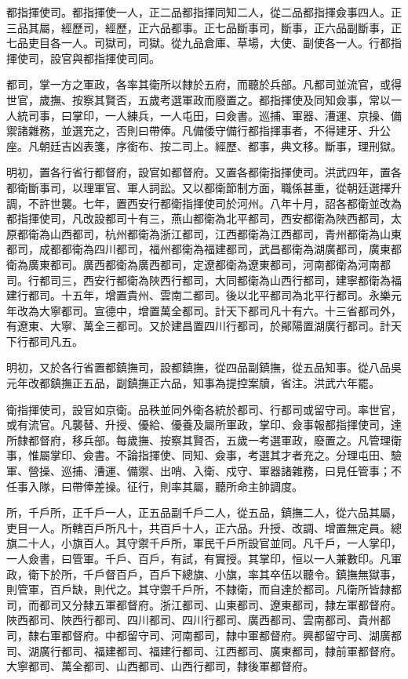 都指揮使司。都指揮使一人，正二品都指揮同知二人，從二品都指揮僉事四人。正三品其屬，經歷司，經歷，正六品都事。正七品斷事司，斷事，正六品副斷事，正七品吏目各一人。司獄司，司獄。從九品倉庫、草場，大使、副使各一人。行都指揮使司，設官與都指揮使司同。

都司，掌一方之軍政，各率其衛所以隸於五府，而聽於兵部。凡都司並流官，或得世官，歲撫、按察其賢否，五歲考選軍政而廢置之。都指揮使及同知僉事，常以一人統司事，曰掌印，一人練兵，一人屯田，曰僉書。巡捕、軍器、漕運、京操、備禦諸雜務，並選充之，否則曰帶俸。凡備倭守備行都指揮事者，不得建牙、升公座。凡朝廷吉凶表箋，序銜布、按二司上。經歷、都事，典文移。斷事，理刑獄。

明初，置各行省行都督府，設官如都督府。又置各都衛指揮使司。洪武四年，置各都衛斷事司，以理軍官、軍人詞訟。又以都衛節制方面，職係甚重，從朝廷選擇升調，不許世襲。七年，置西安行都衛指揮使司於河州。八年十月，詔各都衛並改為都指揮使司，凡改設都司十有三，燕山都衛為北平都司，西安都衛為陜西都司，太原都衛為山西都司，杭州都衛為浙江都司，江西都衛為江西都司，青州都衛為山東都司，成都都衛為四川都司，福州都衛為福建都司，武昌都衛為湖廣都司，廣東都衛為廣東都司。廣西都衛為廣西都司，定遼都衛為遼東都司，河南都衛為河南都司。行都司三，西安行都衛為陜西行都司，大同都衛為山西行都司，建寧都衛為福建行都司。十五年，增置貴州、雲南二都司。後以北平都司為北平行都司。永樂元年改為大寧都司。宣德中，增置萬全都司。計天下都司凡十有六。十三省都司外，有遼東、大寧、萬全三都司。又於建昌置四川行都司，於鄖陽置湖廣行都司。計天下行都司凡五。

明初，又於各行省置都鎮撫司，設都鎮撫，從四品副鎮撫，從五品知事。從八品吳元年改都鎮撫正五品，副鎮撫正六品，知事為提控案牘，省注。洪武六年罷。

衛指揮使司，設官如京衛。品秩並同外衛各統於都司、行都司或留守司。率世官，或有流官。凡襲替、升授、優給、優養及屬所軍政，掌印、僉事報都指揮使司，達所隸都督府，移兵部。每歲撫、按察其賢否，五歲一考選軍政，廢置之。凡管理衛事，惟屬掌印、僉書。不論指揮使、同知、僉事，考選其才者充之。分理屯田、驗軍、營操、巡捕、漕運、備禦、出哨、入衛、戍守、軍器諸雜務，曰見任管事；不任事入隊，曰帶俸差操。征行，則率其屬，聽所命主帥調度。

所，千戶所，正千戶一人，正五品副千戶二人，從五品，鎮撫二人，從六品其屬，吏目一人。所轄百戶所凡十，共百戶十人，正六品。升授、改調、增置無定員。總旗二十人，小旗百人。其守禦千戶所，軍民千戶所設官並同。凡千戶，一人掌印，一人僉書，曰管軍。千戶、百戶，有試，有實授。其掌印，恒以一人兼數印。凡軍政，衛下於所，千戶督百戶，百戶下總旗、小旗，率其卒伍以聽令。鎮撫無獄事，則管軍，百戶缺，則代之。其守禦千戶所，不隸衛，而自達於都司。凡衛所皆隸都司，而都司又分隸五軍都督府。浙江都司、山東都司、遼東都司，隸左軍都督府。陜西都司、陜西行都司、四川都司、四川行都司、廣西都司、雲南都司、貴州都司，隸右軍都督府。中都留守司、河南都司，隸中軍都督府。興都留守司、湖廣都司、湖廣行都司、福建都司、福建行都司、江西都司、廣東都司，隸前軍都督府。大寧都司、萬全都司、山西都司、山西行都司，隸後軍都督府。

